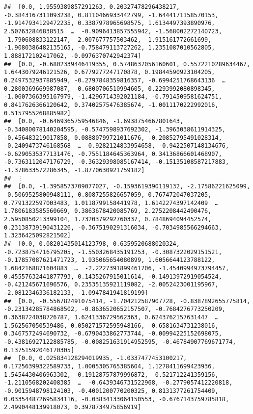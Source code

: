 \documentclass[
]{article}
\begin{document}
\begin{verbatim}
##  [0.0, 1.9559389857291263, 0.20327478296438217, -0.3843167311093238, 0.8110466933442799, -1.6444171158570153, -1.9147934129472235, 0.3387978965698575, 1.6134497393890976, 2.507632846838515  …  -0.9096413857555942, -1.568002272140723, -1.790608833122147, -2.007677757503462, -1.915161772661699, -1.9080386482135165, -0.758479113727262, 1.2351087010562805, 1.888172102417062, -0.0976370742942374]
##  [0.0, -0.6802339446419355, 0.5748637056160601, 0.5572210289634467, 1.6443079246121526, 0.6779277247170878, 0.19844590923104205, 0.2497532937885949, -0.2797848359816357, -0.6994251768643136  …  0.2800369669987087, -0.6800706510994605, 0.2293992080898345, -1.0607366395167979, -1.4296714392021184, -0.7914509581624751, 0.8417626366120642, 0.37402575476385674, -1.0011170222992016, 0.5157955268885982]
##  [0.0, -0.6469365759546846, -1.6938754667801643, -0.34080078140204595, -0.5747598937692302, -1.3963038611914325, -0.456483219017858, 0.08880799721011676, -0.20852795491028314, -0.2409473746168568  …  0.9282124833954658, -0.9422507148134676, -0.6290535377131476, -0.7551184645363964, 0.34136866601468907, -0.7363112047176729, -0.36329398085167414, -0.15135108587217883, -1.378633572286345, -1.8770630921759182]
##  ⋮
##  [0.0, -1.3958573709077027, -0.1593619390119132, -2.17586221625099, -0.5069525800948111, 0.8087255826657059, 0.767472047037205, 0.7791322597003483, 1.0118799158441978, 1.6142274397142409  …  1.7806183585560669, 0.3863678420085769, 2.2752208442490476, 2.5950850213399104, 1.7320379292760337, 0.7848694094452574, 0.23138739190431226, -0.3675190291316034, -0.7034985566294663, 1.3236425092821502]
##  [0.0, 0.08201435014123798, 0.6359520688020324, -0.7238754716795205, -1.5503268435191253, -0.3087322029151521, -0.17857087621471723, 1.935065654080899, 1.6056644123788122, 1.6842168871604883  …  -2.2227391899461706, -1.4540994973794457, 0.45557632441877793, 0.1435267915011614, -0.14913972919054524, -0.421245671696576, 0.23535135921119082, -2.0052423001195967, -2.0812346336182133, -1.0947841941819199]
##  [0.0, -0.556782491075414, -1.704212587907728, -0.8387892655775814, -0.23134285784868502, -0.8636520652157507, -0.7684276773250209, 0.3638724038726787, 1.6241336729562363, 0.6243762157631447  …  1.562567050539486, 0.050271572595948166, -0.6581634731238016, 0.3467572494690732, -0.6790433862773744, -0.00994225152698075, -0.43816927122885785, -0.008251631914952595, -0.46784907769671774, 0.13751592046170305]
##  [0.0, 0.025834128294019935, -1.0337477453100217, 0.17256399322589733, 1.0005305765385604, 1.1278411699423936, 1.5454430406963302, -0.19128757879996872, -0.521712241359156, -1.2110568202408385  …  -0.6439346731522968, -0.2779057412220818, -0.9015948798124103, -0.4001200770200325, 0.8131377261754409, 0.033544872695834116, -0.03834133064150553, -0.6767143759785818, 2.4990448139918073, 0.3978734975856919]

\end{verbatim}
\end{document}
